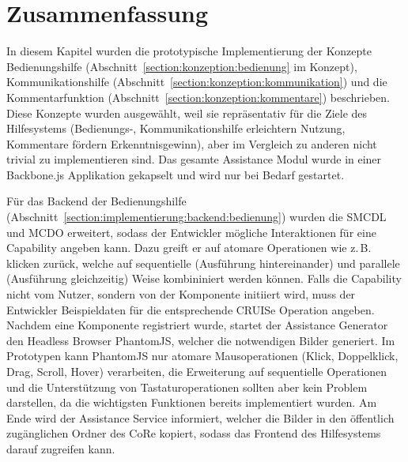 \documentclass[
	headsepline,
	footsepline,
	fontsize=12pt,
	bibliography=totoc
]{scrbook}
\begin{document}
\section{Zusammenfassung}
\label{section:implementierung:zusammenfassung}


In diesem Kapitel wurden die prototypische Implementierung der Konzepte Bedienungshilfe (Abschnitt~\ref{section:konzeption:bedienung} im Konzept), Kommunikationshilfe (Abschnitt~\ref{section:konzeption:kommunikation}) und die Kommentarfunktion (Abschnitt~\ref{section:konzeption:kommentare}) beschrieben. Diese Konzepte wurden ausgewählt, weil sie repräsentativ für die Ziele des Hilfesystems (Bedienungs-, Kommunikationshilfe erleichtern Nutzung, Kommentare fördern Erkenntnisgewinn), aber im Vergleich zu anderen nicht trivial zu implementieren sind. Das gesamte Assistance Modul wurde in einer Backbone.js Applikation gekapselt und wird nur bei Bedarf gestartet.


Für das Backend der Bedienungshilfe (Abschnitt~\ref{section:implementierung:backend:bedienung}) wurden die SMCDL und MCDO erweitert, sodass der Entwickler mögliche Interaktionen für eine Capability angeben kann. Dazu greift er auf atomare Operationen wie z.\,B. klicken zurück, welche auf sequentielle (Ausführung hintereinander) und parallele (Ausführung gleichzeitig) Weise kombininiert werden können. Falls die Capability nicht vom Nutzer, sondern von der Komponente initiiert wird, muss der Entwickler Beispieldaten für die entsprechende CRUISe Operation angeben. Nachdem eine Komponente registriert wurde, startet der Assistance Generator den Headless Browser PhantomJS, welcher die notwendigen Bilder generiert. Im Prototypen kann PhantomJS nur atomare Mausoperationen (Klick, Doppelklick, Drag, Scroll, Hover) verarbeiten, die Erweiterung auf sequentielle Operationen und die Unterstützung von Tastaturoperationen sollten aber kein Problem darstellen, da die wichtigsten Funktionen bereits implementiert wurden. Am Ende wird der Assistance Service informiert, welcher die Bilder in den öffentlich zugänglichen Ordner des CoRe kopiert, sodass das Frontend des Hilfesystems darauf zugreifen kann.
\end{document}

